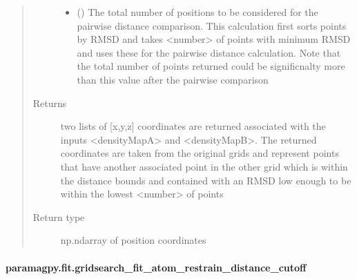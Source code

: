\documentclass[a4paper,10pt,english,openany,oneside]{sphinxmanual}
\begin{document}
\begin{fulllineitems}
\begin{quote}
\begin{description}
\begin{itemize}
\item {} 
 () \textendash{} The total number of positions to be considered
for the pairwise distance comparison.
This calculation first sorts points by RMSD
and takes \textless{}number\textgreater{} of points with minimum RMSD
and uses these for the pairwise distance calculation.
Note that the total number of points returned
could be significnalty more than this value after
the pairwise comparison

\end{itemize}

\item[{Returns}] \leavevmode
{} \textendash{} two lists of {[}x,y,z{]} coordinates are returned associated
with the inputs \textless{}densityMapA\textgreater{} and \textless{}densityMapB\textgreater{}.
The returned coordinates are taken from the original grids
and represent points that have another associated point in
the other grid which is within the distance bounds and
contained with an RMSD low enough to be within the lowest
\textless{}number\textgreater{} of points

\item[{Return type}] \leavevmode
np.ndarray of position coordinates

\end{description}\end{quote}

\end{fulllineitems}



\paragraph{paramagpy.fit.gridsearch\_fit\_atom\_restrain\_distance\_cutoff}
\label{\detokenize{reference/generated/paramagpy.fit.gridsearch_fit_atom_restrain_distance_cutoff:paramagpy-fit-gridsearch-fit-atom-restrain-distance-cutoff}}\label{\detokenize{reference/generated/paramagpy.fit.gridsearch_fit_atom_restrain_distance_cutoff::doc}}
\end{document}
